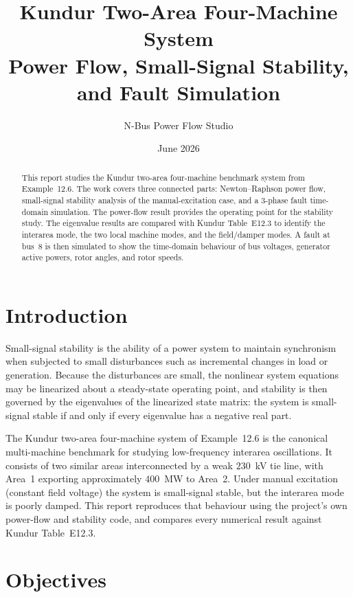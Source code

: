 \documentclass[12pt,a4paper]{article}
\title{\textbf{Kundur Two-Area Four-Machine System}\\
\large Power Flow, Small-Signal Stability, and Fault Simulation}
\author{N-Bus Power Flow Studio}
\date{June 2026}
\begin{document}
\maketitle
\thispagestyle{empty}

\begin{abstract}
This report studies the Kundur two-area four-machine benchmark system from
Example~12.6. The work covers three connected parts: Newton--Raphson power
flow, small-signal stability analysis of the manual-excitation case, and a
3-phase fault time-domain simulation. The power-flow result provides the
operating point for the stability study. The eigenvalue results are compared
with Kundur Table~E12.3 to identify the interarea mode, the two local machine
modes, and the field/damper modes. A fault at bus~8 is then simulated to show
the time-domain behaviour of bus voltages, generator active powers, rotor
angles, and rotor speeds.
\end{abstract}

\newpage
\tableofcontents
\newpage

\section{Introduction}

Small-signal stability is the ability of a power system to maintain synchronism
when subjected to small disturbances such as incremental changes in load or
generation. Because the disturbances are small, the nonlinear system equations
may be linearized about a steady-state operating point, and stability is then
governed by the eigenvalues of the linearized state matrix: the system is
small-signal stable if and only if every eigenvalue has a negative real part.

The Kundur two-area four-machine system of Example~12.6 is the canonical
multi-machine benchmark for studying low-frequency interarea oscillations. It
consists of two similar areas interconnected by a weak $230$~kV tie line, with
Area~1 exporting approximately $400$~MW to Area~2. Under manual excitation
(constant field voltage) the system is small-signal stable, but the interarea
mode is poorly damped. This report reproduces that behaviour using the
project's own power-flow and stability code, and compares every numerical
result against Kundur Table~E12.3.

\section{Objectives}
\end{document}
